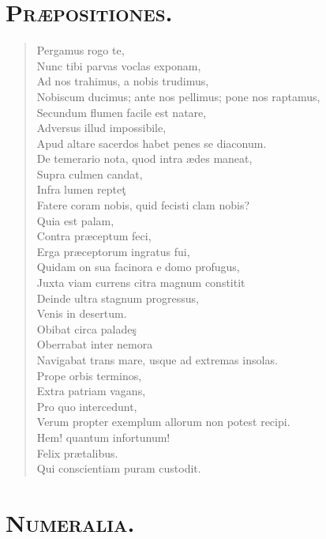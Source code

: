\documentclass[12pt,  postvopaper]{memoir}
\begin{document}
\section*{\textsc{Præpositiones.}}

\begin{verse}

  Pergamus rogo te,\\
  Nunc tibi parvas voclas exponam,\\
  Ad nos trahimus, a nobis trudimus,\\
  Nobiscum ducimus; ante nos pellimus; pone nos raptamus,\\
  Secundum flumen facile est natare,\\
  Adversus illud impossibile,\\
  Apud altare sacerdos habet penes se diaconum.\\
  De temerario nota, quod intra ædes maneat,\\
  Supra culmen candat,\\
  Infra lumen repteţ\\
  Fatere coram nobis, quid fecisti clam nobis?\\
  Quia est palam,\\
  Contra præceptum feci,\\
  Erga præceptorum ingratus fui,\\
  Quidam on sua facinora e domo profugus,\\
  Juxta viam currens citra magnum constitit\\
  Deinde ultra stagnum progressus,\\
  Venis in desertum.\\
  Obibat circa paladeş\\
  Oberrabat inter nemora\\
  Navigabat trans mare, usque ad extremas insolas.\\
  Prope orbis terminos,\\
  Extra patriam vagans,\\
  Pro quo intercedunt,\\
  Verum propter exemplum allorum non potest recipi.\\
  Hem! quantum infortunum!\\
  Felix prætalibus.\\
  Qui conscientiam puram custodit.\\
\end{verse}


\section*{\textsc{Numeralia.}}
\end{document}

